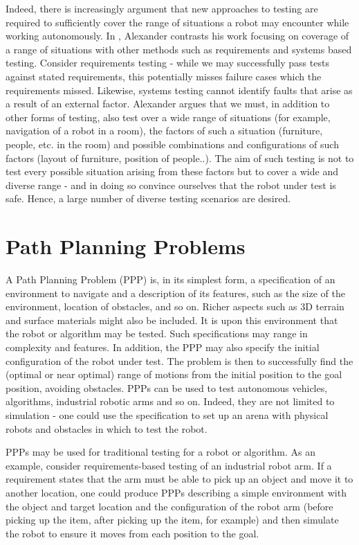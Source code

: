 \documentclass[authoryearcitations]{UoYCSproject}
\begin{document}
Indeed, there is increasingly argument that new approaches to testing are required to sufficiently cover the range of situations a robot may encounter while working autonomously.
In  \cite{rob}, Alexander contrasts his work focusing on coverage of a range of situations with other methods such as requirements and systems based testing. Consider requirements testing - while we may successfully pass tests against stated requirements, this potentially misses failure cases which the requirements missed. Likewise, systems testing cannot identify faults that arise as a result of an external factor. Alexander argues that we must, in addition to other forms of testing, also test over a wide range of situations (for example, navigation of a robot in a room), the factors of such a situation (furniture, people, etc. in the room) and possible combinations and configurations of such factors (layout of furniture, position of people..). The aim of such testing is not to test every possible situation arising from these factors but to cover a wide and diverse range - and in doing so convince ourselves that the robot under test is safe. Hence, a large number of diverse testing scenarios are desired.


\section{Path Planning Problems}
\label{sec:lit2}
A Path Planning Problem (PPP) is, in its simplest form, a specification of an environment to navigate and a description of its features, such as the size of the environment, location of obstacles, and so on. Richer aspects such as 3D terrain and surface materials might also be included. It is upon this environment that the robot or algorithm may be tested. Such specifications may range in complexity and features. In addition, the PPP may also specify the initial configuration of the robot under test. The problem is then to successfully find the (optimal or near optimal) range of motions from the initial position to the goal position, avoiding obstacles. PPPs can be used to test autonomous vehicles, algorithms, industrial robotic arms and so on. Indeed, they are not limited to simulation - one could use the specification to set up an arena with physical robots and obstacles in which to test the robot.

PPPs may be used for traditional testing for a robot or algorithm. As an example, consider requirements-based testing of an industrial robot arm. If a requirement states that the arm must be able to pick up an object and move it to another location, one could produce PPPs describing a simple environment with the object and target location and the configuration of the robot arm (before picking up the item, after picking up the item, for example) and then simulate the robot to ensure it moves from each position to the goal.
\end{document}
